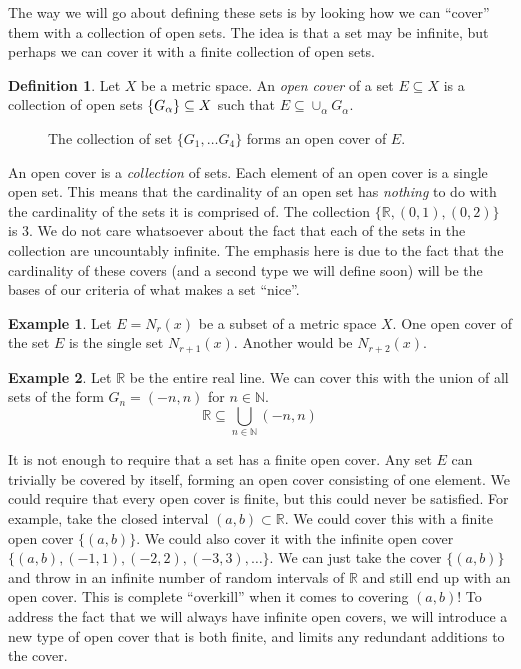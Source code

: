 \documentclass{article}
\newcommand{\N}{\mathbb{N}}
\newcommand{\R}{\mathbb{R}}
\theoremstyle{definition}
\newtheorem{definition}{Definition}[section]
\newtheorem{example}{Example}[section]
\begin{document}
The way we will go about defining these sets is by looking how we can ``cover'' them with a collection of open sets. The idea is that a set may be infinite, but perhaps we can cover it with a finite collection of open sets. 
\begin{definition}
	Let $ X $ be a metric space. An \textit{\color{red}open cover} of a set $ E\subseteq X $ is a collection of open sets $ \mathcal\{G_\alpha\}\subseteq X $ such that $ E\subseteq\cup_\alpha G_\alpha $.  
\end{definition}
  \begin{figure}[h]
	\centering
	\caption{The collection of set $ \{G_1,\ldots G_4\} $ forms an open cover of $ E $.} 
\end{figure}
An open cover is a \textit{collection} of sets. Each element of an open cover is a single open set. This means that the cardinality of an open set has \textit{nothing} to do with the cardinality of the sets it is comprised of. The collection $ \{\R,(0,1),(0,2)\} $ is 3. We do not care whatsoever about the fact that each of the sets in the collection are uncountably infinite. The emphasis here is due to the fact that the cardinality of these covers (and a second type we will define soon) will be the bases of our criteria of what makes a set ``nice''.
\begin{example}
	Let $ E=N_r(x) $ be a subset of a metric space $ X $. One open cover of the set $ E $ is the single set $ N_{r+1}(x) $. Another would be $ N_{r+2}(x) $. 
\end{example}
\begin{example}
	Let $ \R $ be the entire real line. We can cover this with the union of all sets of the form $G_n=(-n,n)$ for $ n\in\N $. $$ \R\subseteq\bigcup_{n\in \N}(-n,n)$$
\end{example}
It is not enough to require that a set has a finite open cover. Any set $ E $ can trivially be covered by itself, forming an open cover consisting of one element. We could require that every open cover is finite, but this could never be satisfied. For example, take the closed interval $ (a,b)\subset\R $. We could cover this with a finite open cover $ \{(a,b)\} $. We could also cover it with the infinite open cover $ \{(a,b),(-1,1),(-2,2),(-3,3),\ldots\} $. We can just take the cover $ \{(a,b)\} $ and throw in an infinite number of random intervals of $ \R $ and still end up with an open cover. This is complete ``overkill'' when it comes to covering $ (a,b) $! To address the fact that we will always have infinite open covers, we will introduce a new type of open cover that is both finite, and limits any redundant additions to the cover. 
\end{document}
